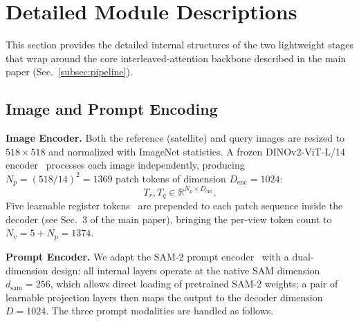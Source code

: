 
\section{Detailed Module Descriptions}
\label{sec:supp_modules}

This section provides the detailed internal structures of the two
lightweight stages that wrap around the core interleaved-attention
backbone described in the main paper (Sec.~\ref{subsec:pipeline}).

\subsection{Image and Prompt Encoding}
\label{sec:supp_enc}

\noindent\textbf{Image Encoder.}
Both the reference (satellite) and query images are resized to $518{\times}518$ and normalized with ImageNet statistics. A frozen DINOv2-ViT-L/14 encoder~\cite{dinov2} processes each image independently, producing $N_p = (518/14)^2 = 1369$ patch tokens of dimension $D_\text{enc}=1024$:
\begin{equation}
  T_r, T_q \in \mathbb{R}^{N_p \times D_\text{enc}}.
\end{equation}
Five learnable register tokens~\cite{dinov2reg} are prepended to each patch sequence inside the decoder (see Sec.~3 of the main paper), bringing the per-view token count to $N_v = 5 + N_p = 1374$.

\noindent\textbf{Prompt Encoder.}
We adapt the SAM-2 prompt encoder~\cite{sam2} with a dual-dimension design: all internal layers operate at the native SAM dimension $d_\text{sam}=256$, which allows direct loading of pretrained SAM-2 weights; a pair of learnable projection layers then maps the output to the decoder dimension $D = 1024$. The three prompt modalities are handled as follows.

